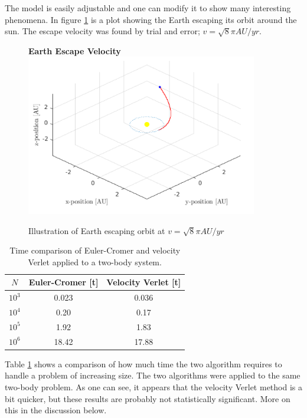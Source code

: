 \documentclass[10pt,a4paper]{amsart}
\begin{document}
The model is easily adjustable and one can modify it to show many interesting phenomena. In figure \ref{fig:earthescape} is a plot showing the Earth escaping its orbit around the sun. The escape velocity was found by trial and error; $v=\sqrt{8}\pi AU/yr$.

\begin{figure}
	\centering
	\textbf{Earth Escape Velocity}
	\includegraphics[width=0.9\textwidth]{../figures/earthescape.png}
	\caption{Illustration of Earth escaping orbit at $v=\sqrt{8}\pi AU/yr$\label{fig:earthescape}}
\end{figure}

\begin{table}
	\centering
	\caption{Time comparison of Euler-Cromer and velocity Verlet applied to a two-body system. \label{tab:eulervsverlet}}
	\begin{tabular}{ccc} \hline
	$N$ & Euler-Cromer [t] & Velocity Verlet [t] \\ \hline
	$10^{3}$ & 0.023 & 0.036   \\
	$10^{4}$ & 0.20  & 0.17   \\
	$10^{5}$ & 1.92  & 1.83   \\
	$10^{6}$ & 18.42 & 17.88 \\ \hline
	\end{tabular}
\end{table}

Table \ref{tab:eulervsverlet} shows a comparison of how much time the two algorithm requires to handle a problem of increasing size. The two algorithms were applied to the same two-body problem. As one can see, it appears that the velocity Verlet method is a bit quicker, but these results are probably not statistically significant. More on this in the discussion below.
\end{document}
